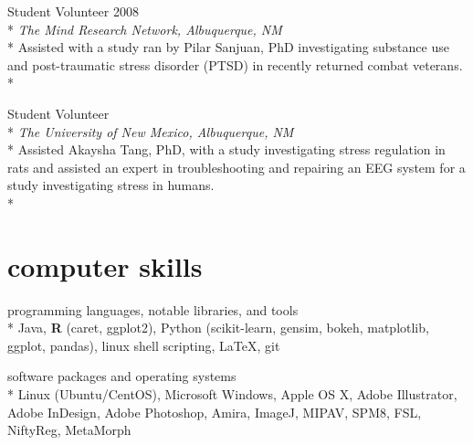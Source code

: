 \documentclass[]{friggeri-cv} %
\begin{document}
\begin{description}
  \item  {\largeheaderfont Student Volunteer } {\smallheaderfont \hfill 2008} \\*
    {\footnotesize \emph{The Mind Research Network, Albuquerque, NM}} \hfill \\*
    Assisted with a study ran by Pilar Sanjuan, PhD investigating substance use
    and post-traumatic stress disorder (PTSD) in recently returned combat
    veterans. \\*
\end{description}


\begin{description}
  \item  {\largeheaderfont Student Volunteer}  \hfill { } \\*
    {\footnotesize \emph{The University of New Mexico, Albuquerque, NM}\textemdash } \\*
    Assisted Akaysha Tang, PhD, with a study investigating stress regulation in
    rats and assisted an expert in troubleshooting and repairing an EEG system
    for a study investigating stress in humans.\\*
\end{description}

\section{computer skills}
\begin{description}
   \item {\smallheaderfont programming languages, notable libraries, and tools} \\*
	Java, \textbf{R} (caret, ggplot2), Python (scikit-learn, gensim, bokeh,
        matplotlib, ggplot, pandas), linux shell scripting, \LaTeX, git
    \item {\smallheaderfont software packages and operating systems} \\*
        Linux (Ubuntu/CentOS), Microsoft Windows, Apple OS X, Adobe
        Illustrator, Adobe InDesign, Adobe Photoshop, Amira, ImageJ,
        MIPAV, SPM8, FSL, NiftyReg, MetaMorph 
\end{description}
\end{document}
